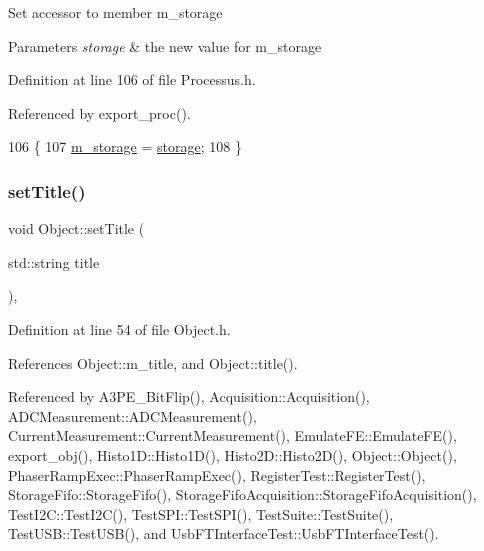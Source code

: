 Set accessor to member m\+\_\+storage 
\begin{DoxyParams}{Parameters}
{\em storage} & the new value for m\+\_\+storage \\
\hline
\end{DoxyParams}


Definition at line 106 of file Processus.\+h.



Referenced by export\+\_\+proc().


\begin{DoxyCode}
106                                       \{
107     \hyperlink{classProcessus_a132b1e71f72327e5a87f0a168c7b6325}{m\_storage} = \hyperlink{classProcessus_a33fa1a0b54a636e5cdd680669fd9ea51}{storage};
108   \}
\end{DoxyCode}
\mbox{\label{classObject_a89557dbbad5bcaa02652f5d7fa35d20f}} 
\subsubsection{\texorpdfstring{set\+Title()}{setTitle()}}
{\footnotesize\ttfamily void Object\+::set\+Title (\begin{DoxyParamCaption}\item[{std\+::string}]{title }\end{DoxyParamCaption})\hspace{0.3cm}{\ttfamily [inline]}, {\ttfamily [inherited]}}



Definition at line 54 of file Object.\+h.



References Object\+::m\+\_\+title, and Object\+::title().



Referenced by A3\+P\+E\+\_\+\+Bit\+Flip(), Acquisition\+::\+Acquisition(), A\+D\+C\+Measurement\+::\+A\+D\+C\+Measurement(), Current\+Measurement\+::\+Current\+Measurement(), Emulate\+F\+E\+::\+Emulate\+F\+E(), export\+\_\+obj(), Histo1\+D\+::\+Histo1\+D(), Histo2\+D\+::\+Histo2\+D(), Object\+::\+Object(), Phaser\+Ramp\+Exec\+::\+Phaser\+Ramp\+Exec(), Register\+Test\+::\+Register\+Test(), Storage\+Fifo\+::\+Storage\+Fifo(), Storage\+Fifo\+Acquisition\+::\+Storage\+Fifo\+Acquisition(), Test\+I2\+C\+::\+Test\+I2\+C(), Test\+S\+P\+I\+::\+Test\+S\+P\+I(), Test\+Suite\+::\+Test\+Suite(), Test\+U\+S\+B\+::\+Test\+U\+S\+B(), and Usb\+F\+T\+Interface\+Test\+::\+Usb\+F\+T\+Interface\+Test().


